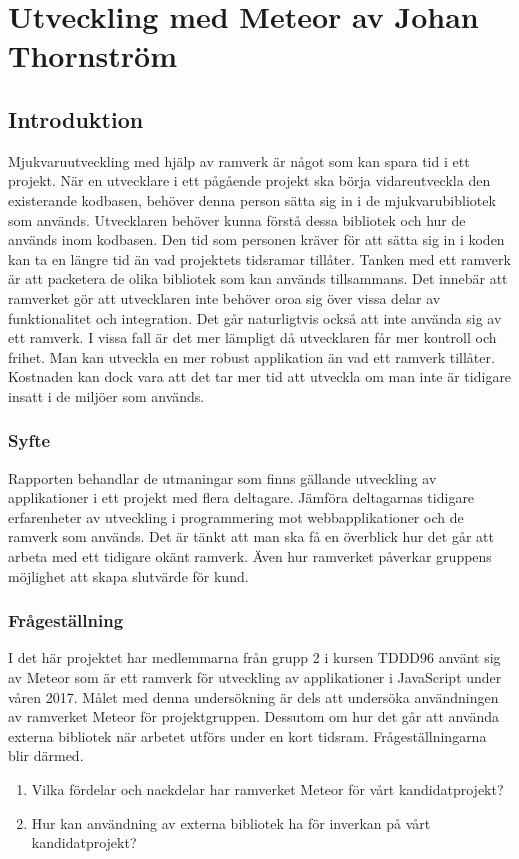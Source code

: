 \chapter{Utveckling med Meteor av Johan Thornström}
\section{Introduktion}
\label{sec:johan_t-introduction}
Mjukvaruutveckling med hjälp av ramverk är något som kan spara tid i ett projekt. När en utvecklare i ett pågående projekt ska börja vidareutveckla den existerande kodbasen, behöver denna person sätta sig in i de mjukvarubibliotek som används. Utvecklaren behöver kunna förstå dessa bibliotek och hur de används inom kodbasen. Den tid som personen kräver för att sätta sig in i koden kan ta en längre tid än vad projektets tidsramar tillåter. Tanken med ett ramverk är att packetera de olika bibliotek som kan används tillsammans. Det innebär att ramverket gör att utvecklaren inte behöver oroa sig över vissa delar av funktionalitet och integration. Det går naturligtvis också att inte använda sig av ett ramverk. I vissa fall är det mer lämpligt då utvecklaren får mer kontroll och frihet. Man kan utveckla en mer robust applikation än vad ett ramverk tillåter. Kostnaden kan dock vara att det tar mer tid att utveckla om man inte är tidigare insatt i de miljöer som används. 
\subsection{Syfte}
\label{sec:johan_t-syfte}
Rapporten behandlar de utmaningar som finns gällande utveckling av applikationer i ett projekt med flera deltagare. Jämföra deltagarnas tidigare erfarenheter av utveckling i programmering mot webbapplikationer och de ramverk som används. Det är tänkt att man ska få en överblick hur det går att arbeta med ett tidigare okänt ramverk. Även hur ramverket påverkar gruppens möjlighet att skapa slutvärde för kund.
\subsection{Frågeställning}
\label{sec:johan_t-frågeställning}
I det här projektet har medlemmarna från grupp 2 i kursen TDDD96 använt sig av Meteor som är ett ramverk för utveckling av applikationer i JavaScript under våren 2017. Målet med denna undersökning är dels att undersöka användningen av ramverket Meteor för projektgruppen. Dessutom om hur det går att använda externa bibliotek när arbetet utförs under en kort tidsram. Frågeställningarna blir därmed.
\newpage
\begin{enumerate}
\item Vilka fördelar och nackdelar har ramverket Meteor för vårt kandidatprojekt?
\item Hur kan användning av externa bibliotek ha för inverkan på vårt kandidatprojekt?
\end{enumerate}
